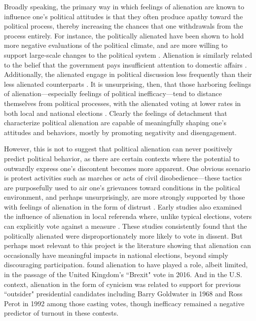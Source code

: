 \documentclass[12pt]{article}
\begin{document}
Broadly speaking, the primary way in which feelings of alienation are known to influence one's political attitudes is that they often produce apathy toward the political process, thereby increasing the chances that one withdrawals from the process entirely. For instance, the politically alienated have been shown to hold more negative evaluations of the political climate, and are more willing to support large-scale changes to the political system \parencite{citrin1975personal}. Alienation is similarly related to the belief that the government pays insufficient attention to domestic affairs \parencite{olsen1965alienation}. Additionally, the alienated engage in political discussion less frequently than their less alienated counterparts \parencite{olsen1969two,finifter1970dimensions}. It is unsurprising, then, that those harboring feelings of alienation---especially feelings of political inefficacy---tend to distance themselves from political processes, with the alienated voting at lower rates in both local \parencite{horton1962powerlessness} and national elections \parencite{aberbach1969alienation,southwell1998electoral}. Clearly the feelings of detachment that characterize political alienation are capable of meaningfully shaping one's attitudes and behaviors, mostly by promoting negativity and disengagement.

However, this is not to suggest that political alienation can never positively predict political behavior, as there are certain contexts where the potential to outwardly express one's discontent becomes more apparent. One obvious scenario is protest activities such as marches or acts of civil disobedience---these tactics are purposefully used to air one's grievances toward conditions in the political environment, and perhaps unsurprisingly, are more strongly supported by those with feelings of alienation in the form of distrust \parencite{citrin1977political}. Early studies also examined the influence of alienation in local referenda where, unlike typical elections, voters can explicitly vote against a measure \parencite{thompson1960political,horton1962powerlessness,mcdill1962status}. These studies consistently found that the politically alienated were disproportionately more likely to vote in dissent. But perhaps most relevant to this project is the literature showing that alienation can occasionally have meaningful impacts in national elections, beyond simply discouraging participation. \textcite{fox2020political} found alienation to have played a role, albeit limited, in the passage of the United Kingdom's ``Brexit" vote in 2016. And in the U.S. context, alienation in the form of cynicism was related to support for previous ``outsider" presidential candidates including Barry Goldwater in 1968 \parencite{aberbach1969alienation} and Ross Perot in 1992 \parencite{atkeson1996citizens,southwell1998electoral} among those casting votes, though inefficacy remained a negative predictor of turnout in these contests. 
\end{document}
